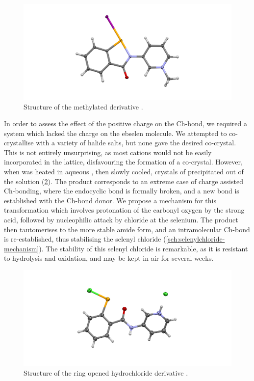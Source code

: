 \begin{refsection}
    \begin{figure}
        \centering
        \includegraphics[width=\linewidth]{Figures/3py-ebs-mei.pdf}
        \caption{Structure of the methylated derivative .}
        \label{fig:3py-ebs-mei}
    \end{figure}
    
    In order to assess the effect of the positive charge on the Ch-bond, we required a system which lacked the charge on the ebselen molecule.
    We attempted to co-crystallise  with a variety of halide salts, but none gave the desired co-crystal.
    This is not entirely unsurprising, as most cations would not be easily incorporated in the lattice, disfavouring the formation of a co-crystal.
    However, when  was heated in aqueous , then slowly cooled, crystals of  precipitated out of the solution (\cref{fig:3py-ebs-hcl}).
    The product  corresponds to an extreme case of charge assisted Ch-bonding, where the endocyclic  bond is formally broken, and a new bond is established with the Ch-bond donor.
    We propose a mechanism for this transformation which involves protonation of the carbonyl oxygen by the strong acid, followed by nucleophilic attack by chloride at the selenium.
    The product then tautomerises to the more stable amide form, and an intramolecular Ch-bond is re-established, thus stabilising the selenyl chloride (\cref{sch:selenylchloride-mechanism}).
    The stability of this selenyl chloride is remarkable, as it is resistant to hydrolysis and oxidation, and may be kept in air for several weeks.
    
    \begin{figure}
        \centering
        \includegraphics[width=\linewidth]{Figures/3py-ebs-hcl.pdf}
        \caption{Structure of the ring opened hydrochloride derivative .}
        \label{fig:3py-ebs-hcl}
    \end{figure}
    
    \printbibliography[heading=subbibliography]
    
\end{refsection}